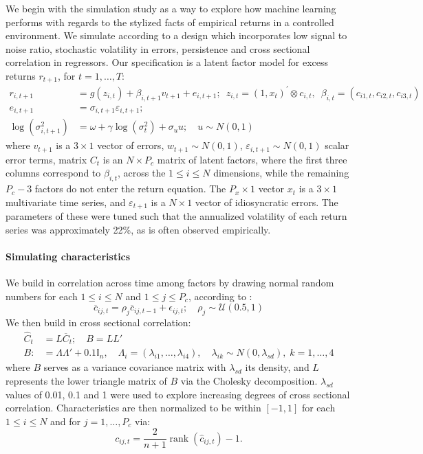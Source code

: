 \documentclass{article}
\begin{document}
We begin with the simulation study as a way to explore how machine learning performs with regards to the stylized facts of empirical returns in a controlled environment. We simulate according to a design which incorporates low signal to noise ratio, stochastic volatility in errors, persistence and cross sectional correlation in regressors. Our specification is a latent factor model for excess returns $r_{t+1}$, for $t=1, \dots, T$:
\begin{align}
r_{i, t+1} &= 
g\left(z_{i, t}\right) + \beta_{i,t+1}v_{t+1} + e_{i, t+1}; 
\enspace z_{i, t} = \left(1, x_{t}\right)^{\prime} \otimes c_{i, t}, 
\enspace \beta_{i, t} = \left(c_{i 1, t}, c_{i 2, t}, c_{i 3, t}\right) \\ 
e_{i, t+1} &= 
\sigma_{i, t+1} \varepsilon_{i, t+1}; \\
\operatorname{log} (\sigma^2_{i,t+1}) &= 
\omega + \gamma \operatorname{log} (\sigma^2_{t}) + \sigma_{u}u;
\quad u \sim N(0, 1)
\end{align}
where $v_{t+1}$ is a $3\times 1$ vector of errors, $w_{t+1} \sim N(0, 1)$,  $\varepsilon_{i,t+1} \sim N(0, 1)$ scalar error terms, matrix $C_t$ is an $N\times P_c$ matrix of latent factors, where the first three columns correspond to $\beta_{i,t}$, across the $1\leq i\leq N$ dimensions, while the remaining $P_c-3$ factors do not enter the return equation. The $P_x\times1$ vector $x_t$ is a $3 \times 1$ multivariate time series, and $\varepsilon_{t+1}$ is a $N\times 1$ vector of idiosyncratic errors. The parameters of these were tuned such that the annualized volatility of each return series was approximately 22\%, as is often observed empirically.
\paragraph{Simulating characteristics}
We build in correlation across time among factors by drawing normal random numbers for each $1\leq i\leq N$ and $1\leq j\leq P_{c}$, according to :
\begin{equation}
\overline{c}_{i j, t} = \rho_{j} \overline{c}_{i j, t-1}+\epsilon_{i j, t} ;
\quad \rho_{j} \sim \mathcal{U} \left( 0.5, 1 \right) 
\end{equation}
We then build in cross sectional correlation:
\begin{align}
\widehat{C}_{t}&=L\overline{C}_{t} ; \quad B = LL' \\
B:&=\Lambda\Lambda' + 0.1\mathbb{I}_{n}, \quad
\Lambda_i = (\lambda_{i1}, \dots, \lambda_{i4}), \quad
\lambda_{ik}\sim N(0, \lambda_{sd}), \; k=1, \dots, 4
\end{align}
where $B$ serves as a variance covariance matrix with $\lambda_{sd}$ its density, and $L$ represents the lower triangle matrix of $B$ via the Cholesky decomposition. $\lambda_{sd}$ values of 0.01, 0.1 and 1 were used to explore increasing degrees of cross sectional correlation.
Characteristics are then normalized to be within $[-1, 1]$ for each $1\leq i\leq N$ and for $j=1, \dots, P_{c}$ via:
\begin{equation}
c_{i j, t} = \frac{2}{n+1} \operatorname{rank}\left(\hat{c}_{i j, t}\right) - 1.
\end{equation}
\end{document}
